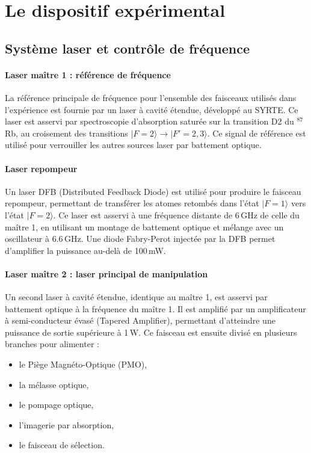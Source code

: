 \section{Le dispositif expérimental}
\subsection{Système laser et contrôle de fréquence}
\label{sec:systeme_laser}

\paragraph{Laser maître 1 : référence de fréquence}
La référence principale de fréquence pour l'ensemble des faisceaux utilisés dans l'expérience est fournie par un laser à cavité étendue, développé au SYRTE. Ce laser est asservi par spectroscopie d’absorption saturée sur la transition D2 du $^{87}$Rb, au croisement des transitions $|F=2\rangle \rightarrow |F'=2,3\rangle$. Ce signal de référence est utilisé pour verrouiller les autres sources laser par battement optique.

\paragraph{Laser repompeur}
Un laser DFB (Distributed Feedback Diode) est utilisé pour produire le faisceau repompeur, permettant de transférer les atomes retombés dans l’état $|F=1\rangle$ vers l’état $|F=2\rangle$. Ce laser est asservi à une fréquence distante de 6\,GHz de celle du maître 1, en utilisant un montage de battement optique et mélange avec un oscillateur à 6.6\,GHz. Une diode Fabry-Perot injectée par la DFB permet d’amplifier la puissance au-delà de 100\,mW.

\paragraph{Laser maître 2 : laser principal de manipulation}
Un second laser à cavité étendue, identique au maître 1, est asservi par battement optique à la fréquence du maître 1. Il est amplifié par un amplificateur à semi-conducteur évasé (Tapered Amplifier), permettant d’atteindre une puissance de sortie supérieure à 1\,W. Ce faisceau est ensuite divisé en plusieurs branches pour alimenter :
\begin{itemize}
    \item le Piège Magnéto-Optique (PMO),
    \item la mélasse optique,
    \item le pompage optique,
    \item l’imagerie par absorption,
    \item le faisceau de sélection.
\end{itemize}

